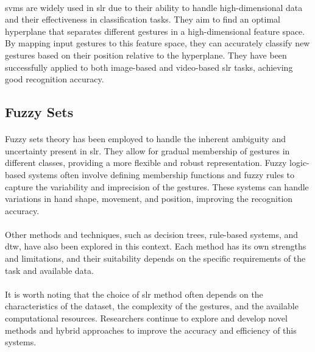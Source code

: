 \paragraph{}
\ac{svm}s are widely used in \ac{slr} due to their ability to handle high-dimensional data and their effectiveness in classification tasks. They aim to find an optimal hyperplane that separates different gestures in a high-dimensional feature space. By mapping input gestures to this feature space, they can accurately classify new gestures based on their position relative to the hyperplane. They have been successfully applied to both image-based and video-based \ac{slr} tasks, achieving good recognition accuracy.

\subsection{Fuzzy Sets}
\paragraph{}
Fuzzy sets theory has been employed to handle the inherent ambiguity and uncertainty present in \ac{slr}. They allow for gradual membership of gestures in different classes, providing a more flexible and robust representation. Fuzzy logic-based systems often involve defining membership functions and fuzzy rules to capture the variability and imprecision of the gestures. These systems can handle variations in hand shape, movement, and position, improving the recognition accuracy.

\paragraph{}
Other methods and techniques, such as decision trees, rule-based systems, and \ac{dtw}, have also been explored in this context. Each method has its own strengths and limitations, and their suitability depends on the specific requirements of the task and available data.
\paragraph{}
It is worth noting that the choice of \ac{slr} method often depends on the characteristics of the dataset, the complexity of the gestures, and the available computational resources. Researchers continue to explore and develop novel methods and hybrid approaches to improve the accuracy and efficiency of this systems.
